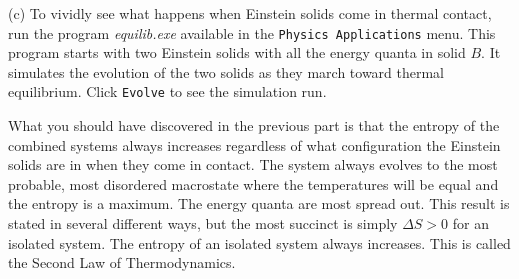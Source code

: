 (c) To  vividly see what happens when Einstein solids come in thermal contact,
run the program {\it equilib.exe} available in the {\tt Physics Applications} menu.
This program starts with two Einstein solids with all the energy quanta in solid $B$.
It simulates the evolution of the two solids as they march toward
thermal equilibrium.
Click {\tt Evolve} to see the simulation run.

What you should have discovered in the previous part is that the entropy of the combined systems
always increases regardless of what configuration the Einstein solids are in when they
come in contact.
The system always evolves to the most probable, most disordered
 macrostate where the temperatures will
be equal and the entropy is a maximum.
The energy quanta are most spread out.
This result is stated in several different ways, but the most succinct is simply
$\Delta S > 0$ for an isolated system.
The entropy of an isolated system always increases.
This is called the Second Law of Thermodynamics.

\bigskip


 





